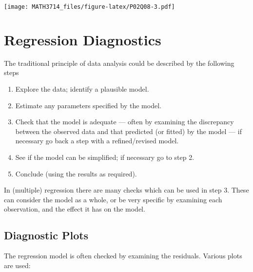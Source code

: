 \documentclass[
  a4paper,
]{article}
\providecommand{\tightlist}{%
  \setlength{\itemsep}{0pt}\setlength{\parskip}{0pt}}
\theoremstyle{definition}
\theoremstyle{definition}
\theoremstyle{definition}
\theoremstyle{definition}
\theoremstyle{remark}
\begin{document}
\begin{myanswers}
\texttt{[image: MATH3714\_files/figure-latex/P02Q08-3.pdf]}

\end{myanswers}

\clearpage

\hypertarget{S08-diagnostics}{%
\section{Regression Diagnostics}\label{S08-diagnostics}}

The traditional principle of data analysis could be described by the following
steps

\begin{enumerate}
\def\labelenumi{\arabic{enumi}.}
\tightlist
\item
  Explore the data; identify a plausible model.
\item
  Estimate any parameters specified by the model.
\item
  Check that the model is adequate --- often by examining the discrepancy
  between the observed data and that predicted (or fitted) by the model --- if
  necessary go back a step with a refined/revised model.
\item
  See if the model can be simplified; if necessary go to step 2.
\item
  Conclude (using the results as required).
\end{enumerate}

In (multiple) regression there are many checks which can be used in step 3.
These can consider the model as a whole, or be very specific by examining each
observation, and the effect it has on the model.

\hypertarget{plots}{%
\subsection{Diagnostic Plots}\label{plots}}

The regression model is often checked by examining the residuals. Various plots
are used:
\end{document}
